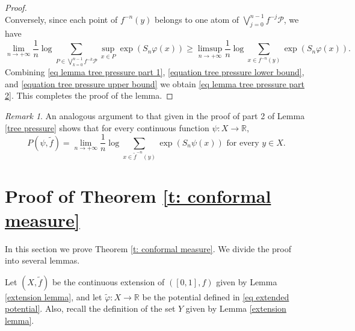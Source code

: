 \documentclass[12pt]{amsart}
\numberwithin{equation}{section} %
\numberwithin{figure}{section} %
\theoremstyle{plain}
\theoremstyle{definition}
\theoremstyle{remark}
\newtheorem{rema}[prop]{Remark}
\theoremstyle{citing}
\newcommand{\R}{\mathbb{R}}
\renewcommand{\=}{\coloneqq}
\begin{document}
\begin{proof}
\begin{equation}
\end{equation}
Conversely, since each point of $f^{-n}(y)$ belongs to one atom of $\bigvee_{j=0}^{n-1} f^{-j}\mathcal{P}$, we have
\begin{equation}\label{equation tree pressure upper bound}
    \lim_{n\to+\infty}  \frac{1}{n}\log \sum_{P\in \bigvee_{k=0}^{n-1}f^{-k} \mathcal{P}} \sup_{x\in P}\exp(S_n\varphi(x)) \geq \limsup_{n\to+\infty} \frac{1}{n} \log \sum_{x\in f^{-n}(y)} \exp(S_n \varphi(x)).
\end{equation}
Combining \eqref{eq lemma tree pressure part 1}, \eqref{equation tree pressure lower bound}, and \eqref{equation tree pressure upper bound} we obtain \eqref{eq lemma tree pressure part 2}. This completes the proof of the lemma. 
\end{proof}
\begin{rema}\label{r: pressure via transfer op for the extension}
    An analogous argument to that given in the proof of part 2 of Lemma \ref{tree pressure} shows that for every continuous function $\psi: X \to \R$,
    \begin{equation*}
        P(\psi,\widetilde{f}) = \lim_{n\to+\infty}\frac{1}{n}\log \sum_{x\in \widetilde{f}^{-n}(y)} \exp(S_n\psi(x)) \text{ for every } y\in X.
    \end{equation*}
\end{rema}

\section{Proof of Theorem \ref{t: conformal measure}}\label{sec: proof of theo A} 

In this section we prove Theorem \ref{t: conformal measure}. We divide the proof into several lemmas.

\noindent Let $( X, \widetilde{f})$ be the continuous extension of $([0,1],f)$ given by Lemma \ref{extension lemma}, and let $\widetilde{\varphi}: X\to \R$ be the potential defined in \eqref{eq extended potential}. Also, recall the definition of the set ${Y}$ given by Lemma \ref{extension lemma}.
\end{document}
